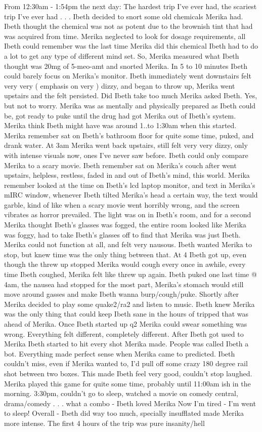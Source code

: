 \documentclass[12pt]{book}
\begin{document}
From 12:30am - 1:54pm the next day: The hardest trip I've ever had, the scariest trip I've ever had . . .  Ibeth decided to snort some old chemicals Merika had. Ibeth thought the chemical was not as potent due to the brownish tint that had was acquired from time. Merika neglected to look for dosage requirements, all Ibeth could remember was the last time Merika did this chemical Ibeth had to do a lot to get any type of different mind set. So, Merika measured what Ibeth thought was 20mg of 5-meo-amt and snorted Merika. In 5 to 10 minutes Ibeth could barely focus on Merika's monitor. Ibeth immediately went downstairs felt very very ( emphasis on very ) dizzy, and began to throw up, Merika went upstairs and the felt persisted. Did Ibeth take too much Merika asked Ibeth. Yes, but not to worry. Merika was as mentally and physically prepared as Ibeth could be, got ready to puke until the drug had got Merika out of Ibeth's system. Merika think Ibeth might have was around 1..to 1:30am when this started. Merika remember sat on Ibeth's bathroom floor for quite some time, puked, and drank water. At 3am Merika went back upstairs, still felt very very dizzy, only with intense visuals now, ones I've never saw before. Ibeth could only compare Merika to a scary movie. Ibeth remember sat on Merika's couch after went upstairs, helpless, restless, faded in and out of Ibeth's mind, this world. Merika remember looked at the time on Ibeth's lcd laptop monitor, and text in Merika's mIRC window, whenever Ibeth tilted Merika's head a certain way, the text would garble, kind of like when a scary movie went horribly wrong, and the screen vibrates as horror prevailed. The light was on in Ibeth's room, and for a second Merika thought Ibeth's glasses was fogged, the entire room looked like Merika was foggy, had to take Ibeth's glasses off to find that Merika was just Ibeth. Merika could not function at all, and felt very nausous. Ibeth wanted Merika to stop, but knew time was the only thing between that. At 4 Ibeth got up, even though the threw up stopped Merika would cough every once in awhile, every time Ibeth coughed, Merika felt like threw up again. Ibeth puked one last time @ 4am, the nausea had stopped for the most part, Merika's stomach would still move around gasses and make Ibeth wanna burp/cough/puke. Shortly after Merika decided to play some quake2/ra2 and listen to music. Ibeth knew Merika was the only thing that could keep Ibeth sane in the hours of tripped that was ahead of Merika. Once Ibeth started up q2 Merika could swear something was wrong. Everything felt different, completely different. After Ibeth got used to Merika Ibeth started to hit every shot Merika made. People was called Ibeth a bot. Everything made perfect sense when Merika came to predicted. Ibeth couldn't miss, even if Merika wanted to, I'd pull off some crazy 180 degree rail shot between two boxes. This made Ibeth feel very good, couldn't stop laughed. Merika played this game for quite some time, probably until 11:00am ish in the morning. 3:30pm, couldn't go to sleep, watched a movie on comedy central, drama/comedy . . .  what a combo - Ibeth loved Merika Now I'm tired - I'm went to sleep! Overall - Ibeth did way too much, specially insufflated made Merika more intense. The first 4 hours of the trip was pure insanity/hell 
\end{document}
